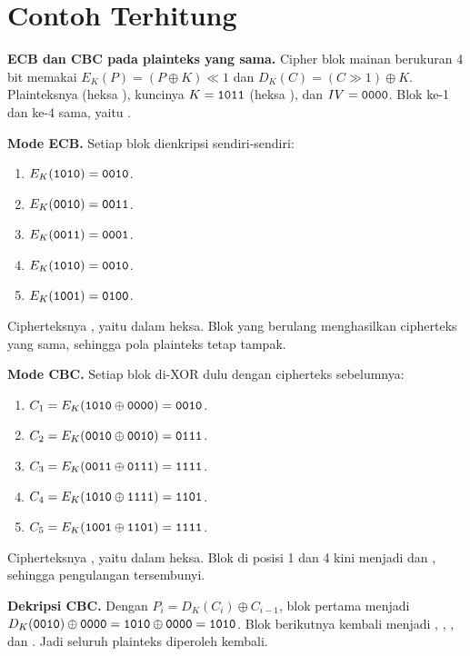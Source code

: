 \section{Contoh Terhitung}

\begin{example}
\textbf{ECB dan CBC pada plainteks yang sama.} Cipher blok mainan berukuran
4 bit memakai $E_K(P) = (P \oplus K) \ll 1$ dan
$D_K(C) = (C \gg 1) \oplus K$. Plainteksnya 
(heksa ), kuncinya $K = \texttt{1011}$ (heksa ), dan
$IV = \texttt{0000}$. Blok ke-1 dan ke-4 sama, yaitu .

\textbf{Mode ECB.} Setiap blok dienkripsi sendiri-sendiri:
\begin{enumerate}
    \item $E_K(\texttt{1010}) = \texttt{0010}$.
    \item $E_K(\texttt{0010}) = \texttt{0011}$.
    \item $E_K(\texttt{0011}) = \texttt{0001}$.
    \item $E_K(\texttt{1010}) = \texttt{0010}$.
    \item $E_K(\texttt{1001}) = \texttt{0100}$.
\end{enumerate}
Cipherteksnya , yaitu  dalam heksa.
Blok  yang berulang menghasilkan cipherteks  yang sama,
sehingga pola plainteks tetap tampak.

\textbf{Mode CBC.} Setiap blok di-XOR dulu dengan cipherteks sebelumnya:
\begin{enumerate}
    \item $C_1 = E_K(\texttt{1010} \oplus \texttt{0000}) = \texttt{0010}$.
    \item $C_2 = E_K(\texttt{0010} \oplus \texttt{0010}) = \texttt{0111}$.
    \item $C_3 = E_K(\texttt{0011} \oplus \texttt{0111}) = \texttt{1111}$.
    \item $C_4 = E_K(\texttt{1010} \oplus \texttt{1111}) = \texttt{1101}$.
    \item $C_5 = E_K(\texttt{1001} \oplus \texttt{1101}) = \texttt{1111}$.
\end{enumerate}
Cipherteksnya , yaitu  dalam heksa.
Blok  di posisi 1 dan 4 kini menjadi  dan ,
sehingga pengulangan tersembunyi.

\textbf{Dekripsi CBC.} Dengan $P_i = D_K(C_i) \oplus C_{i-1}$, blok pertama
menjadi $D_K(\texttt{0010}) \oplus \texttt{0000} = \texttt{1010} \oplus \texttt{0000} =
\texttt{1010}$. Blok berikutnya kembali menjadi , ,
, dan . Jadi seluruh plainteks  diperoleh
kembali.
\end{example}
